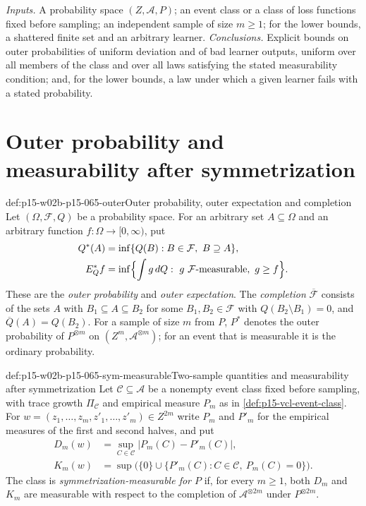 \emph{Inputs.} A probability space \((Z,\mathcal A,P)\); an event class or a
class of loss functions fixed before sampling; an independent sample of size
\(m\geq1\); for the lower bounds, a shattered finite set and an arbitrary
learner. \emph{Conclusions.} Explicit bounds on outer probabilities of
uniform deviation and of bad learner outputs, uniform over all members of the
class and over all laws satisfying the stated measurability condition; and,
for the lower bounds, a law under which a given learner fails with a stated
probability.

\section{Outer probability and measurability after symmetrization}
\label{sec:p15-w02b-p15-065-outer}

\begin{hbdefinition}{def:p15-w02b-p15-065-outer}{Outer probability, outer expectation and completion}
Let \((\Omega,\mathcal F,Q)\) be a probability space. For an arbitrary set
\(A\subseteq\Omega\) and an arbitrary function
\(f:\Omega\to[0,\infty)\), put
\begin{align*}
 Q^{*}(A)&=\inf\{Q(B):B\in\mathcal F,\ B\supseteq A\},\\
 E_Q^{*}f&=\inf\Bigl\{\int g\,dQ:\ g\ \mathcal F\text{-measurable},\ g\geq f\Bigr\}.
\end{align*}
These are the \emph{outer probability} and \emph{outer expectation}. The
\emph{completion} \(\overline{\mathcal F}\) consists of the sets \(A\) with
\(B_1\subseteq A\subseteq B_2\) for some \(B_1,B_2\in\mathcal F\) with
\(Q(B_2\setminus B_1)=0\), and \(\overline Q(A)=Q(B_2)\).
For a sample of size \(m\) from \(P\), \(P^{*}\) denotes the outer
probability of \(P^{\otimes m}\) on \((Z^m,\mathcal A^{\otimes m})\); for an
event that is measurable it is the ordinary probability.
\end{hbdefinition}

\begin{hbdefinition}{def:p15-w02b-p15-065-sym-measurable}{Two-sample quantities and measurability after symmetrization}
Let \(\mathcal C\subseteq\mathcal A\) be a nonempty event class fixed before
sampling, with trace growth \(\Pi_{\mathcal C}\) and empirical measure
\(P_m\) as in \cref{def:p15-vcl-event-class}. For
\(w=(z_1,\ldots,z_m,z'_1,\ldots,z'_m)\in Z^{2m}\) write \(P_m\) and
\(P'_m\) for the empirical measures of the first and second halves, and put
\begin{align*}
 D_m(w)&=\sup_{C\in\mathcal C}|P_m(C)-P'_m(C)|,\\
 K_m(w)&=\sup\bigl(\{0\}\cup\{P'_m(C):C\in\mathcal C,\ P_m(C)=0\}\bigr).
\end{align*}
The class is \emph{symmetrization-\allowbreak measurable for \(P\)} if, for every
\(m\geq1\), both \(D_m\) and \(K_m\) are measurable with respect to the
completion of \(\mathcal A^{\otimes2m}\) under \(P^{\otimes2m}\).
\end{hbdefinition}

